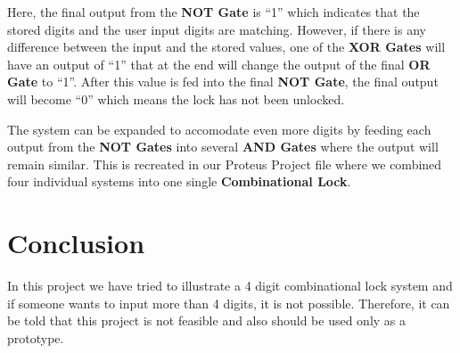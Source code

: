 \documentclass{article}
\begin{document}
\vspace{1cm}

Here, the final output from the {\bf NOT Gate} is ``1'' which indicates
that the stored digits and the user input digits are matching. However,
if there is any difference between the input and the stored values, one
of the {\bf XOR Gates} will have an output of ``1'' that at the end will
change the output of the final {\bf OR Gate} to ``1''. After this value
is fed into the final {\bf NOT Gate}, the final output will become ``0''
which means the lock has not been unlocked.

\vspace{.5cm}

The system can be expanded to accomodate even more digits by feeding
each output from the {\bf NOT Gates} into several {\bf AND Gates} where
the output will remain similar. This is recreated in our Proteus Project
file where we combined four individual systems into one single {\bf
Combinational Lock}. 

\vspace{1cm}

\section{Conclusion}

In this project we have tried to illustrate a 4 digit combinational lock system and if someone wants to input more than 4 digits, it is not possible. Therefore, it can be told that this project is not feasible and also should be used only as a prototype.
\end{document}
